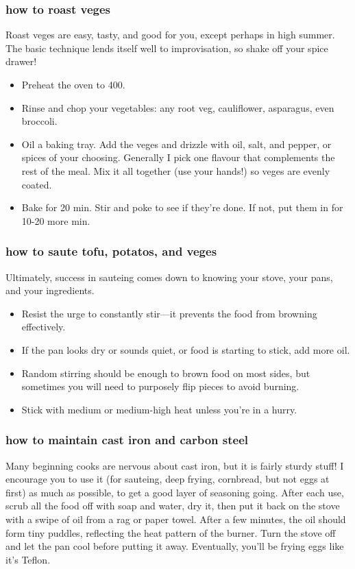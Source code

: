 \subsubsection{how to roast veges}
Roast veges are easy, tasty, and good for you, except perhaps in high summer. The basic technique lends itself well to improvisation, so shake off your spice drawer!
  \begin{itemize}
  \item Preheat the oven to 400\0.
  \item Rinse and chop your vegetables: any root veg, cauliflower, asparagus, even broccoli.
  \item Oil a baking tray. Add the veges and drizzle with oil, salt, and pepper, or spices of your choosing. Generally I pick one flavour that complements the rest of the meal. Mix it all together (use your hands!) so veges are evenly coated.
  \item Bake for 20 min. Stir and poke to see if they're done. If not, put them in for 10-20 more min.
  \end{itemize}

\subsubsection{how to saute tofu, potatos, and veges}
Ultimately, success in sauteing comes down to knowing your stove, your pans, and your ingredients.
  \begin{itemize}
    \item Resist the urge to constantly stir---it prevents the food from browning effectively.
  \item If the pan looks dry or sounds quiet, or food is starting to stick, add more oil.
  \item Random stirring should be enough to brown food on most sides, but sometimes you will need to purposely flip pieces to avoid burning.
  \item Stick with medium or medium-high heat unless you're in a hurry.
  \end{itemize}

\subsubsection{how to maintain cast iron and carbon steel}
Many beginning cooks are nervous about cast iron, but it is fairly sturdy stuff! I encourage you to use it (for sauteing, deep frying, cornbread, but not eggs at first) as much as possible, to get a good layer of seasoning going. After each use, scrub all the food off with soap and water, dry it, then put it back on the stove with a swipe of oil from a rag or paper towel. After a few minutes, the oil should form tiny puddles, reflecting the heat pattern of the burner. Turn the stove off and let the pan cool before putting it away. Eventually, you'll be frying eggs like it's Teflon.

